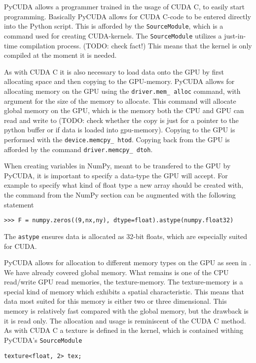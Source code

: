 PyCUDA allows a programmer trained in the usage of CUDA C, to easily start programming. Basically PyCUDA allows for CUDA C-code to be entered directly into the Python script. This is afforded by the \texttt{SourceModule}, which is a command used for creating CUDA-kernels. The \texttt{SourceModule} utilizes a just-in-time compilation process. (TODO: check fact!) This means that the kernel is only compiled at the moment it is needed.

As with CUDA C it is also necessary to load data onto the GPU by first allocating space and then copying to the GPU-memory. PyCUDA allows for allocating memory on the GPU using the \texttt{driver.mem\_ alloc} command, with argument for the size of the memory to allocate. This command will allocate global memory on the GPU, which is the memory both the CPU and GPU can read and write to (TODO: check whether the copy is just for a pointer to the python buffer or if data is loaded into gpu-memory). Copying to the GPU is performed with the \texttt{device.memcpy\_ htod}. Copying back from the GPU is afforded by the command \texttt{driver.memcpy\_ dtoh}.

When creating variables in NumPy, meant to be transfered to the GPU by PyCUDA, it is important to specify a data-type the GPU will accept. For example to specify what kind of float type a new array should be created with, the command from the NumPy section can be augmented with the following statement

\begin{verbatim}
>>> F = numpy.zeros((9,nx,ny), dtype=float).astype(numpy.float32)
\end{verbatim}

The \texttt{astype} ensures data is allocated as 32-bit floats, which are especially suited for CUDA.

PyCUDA allows for allocation to different memory types on the GPU as seen in . We have already covered global memory. What remains is one of the CPU read/write GPU read memories, the texture-memory. The texture-memory is a special kind of memory which exhibits a spatial characteristic. This means that data most suited for this memory is either two or three dimensional. This memory is relatively fast compared with the global memory, but the drawback is it is read only. The allocation and usage is reminiscent of the CUDA C method. As with CUDA C a texture is defined in the kernel, which is contained withing PyCUDA's \texttt{SourceModule}

\begin{verbatim}
texture<float, 2> tex;
\end{verbatim}

